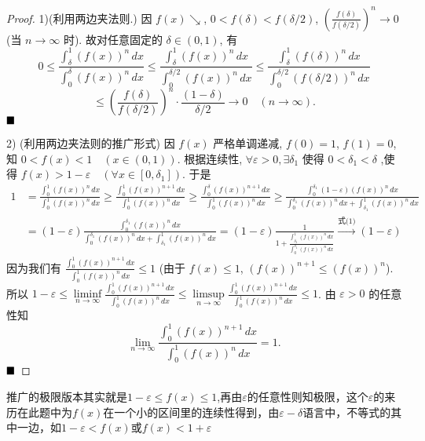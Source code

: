 \documentclass[lang=cn,newtx,10pt,scheme=chinese]{elegantbook}
\begin{document}
\begin{proof}
1)(利用两边夹法则.) 因 $f(x) \searrow$, $0 < f(\delta) < f(\delta/2)$, $\left(\frac{f(\delta)}{f(\delta/2)}\right)^n \to 0$ (当 $n \to \infty$ 时). 故对任意固定的 $\delta \in (0,1)$, 有
$$0 \leq \frac{\int_{\delta}^{1} (f(x))^n \,dx}{\int_{0}^{\delta} (f(x))^n \,dx} \leq \frac{\int_{\delta}^{1} (f(x))^n \,dx}{\int_{0}^{\delta/2} (f(x))^n \,dx} \leq \frac{\int_{\delta}^{1} (f(\delta))^n \,dx}{\int_{0}^{\delta/2} (f(\delta/2))^n \,dx}$$
$$\leq \left(\frac{f(\delta)}{f(\delta/2)}\right)^n \cdot \frac{(1-\delta)}{\delta/2} \to 0 \quad (n \to \infty).$$
$\hfill \blacksquare$

2)
(利用两边夹法则的推广形式) 因 $f(x)$ 严格单调递减, $f(0)=1$, $f(1)=0$, 知 $0 < f(x) < 1 \quad (x \in (0,1))$. 根据连续性, $\forall \varepsilon > 0, \exists \delta_1$ 使得 $0 < \delta_1 < \delta$ ,使得 $f(x) > 1-\varepsilon \quad (\forall x \in [0, \delta_1])$. 于是
\begin{align*} 1 &= \frac{\int_0^1 (f(x))^n \,dx}{\int_0^1 (f(x))^n \,dx}  \geq \frac{\int_0^1 (f(x))^{n+1} \,dx}{\int_0^1 (f(x))^n \,dx} \geq \frac{\int_0^{\delta} (f(x))^{n+1} \,dx}{\int_0^1 (f(x))^n \,dx} \geq \frac{\int_0^{\delta_1} (1-\varepsilon) (f(x))^n \,dx}{\int_0^{\delta_1} (f(x))^n \,dx + \int_{\delta_1}^1 (f(x))^n \,dx} \\ &= (1-\varepsilon) \frac{\int_0^{\delta_1} (f(x))^n \,dx}{\int_0^{\delta_1} (f(x))^n \,dx + \int_{\delta_1}^1 (f(x))^n \,dx} = (1-\varepsilon) \frac{1}{1 + \frac{\int_{\delta_1}^1 (f(x))^n \,dx}{\int_0^{\delta_1} (f(x))^n \,dx}} \xrightarrow{\text{式(1)}} (1-\varepsilon)  \end{align*}
因为我们有 $\frac{\int_0^1 (f(x))^{n+1} \,dx}{\int_0^1 (f(x))^n \,dx} \leq 1$ (由于 $f(x) \leq 1$, $(f(x))^{n+1} \leq (f(x))^n$).
所以 $1-\varepsilon \leq \liminf\limits_{n \to \infty} \frac{\int_0^1 (f(x))^{n+1} \,dx}{\int_0^1 (f(x))^n \,dx} \leq \limsup\limits_{n \to \infty} \frac{\int_0^1 (f(x))^{n+1} \,dx}{\int_0^1 (f(x))^n \,dx} \leq 1$.
由 $\varepsilon > 0$ 的任意性知
$$ \lim\limits_{n \to \infty} \frac{\int_0^1 (f(x))^{n+1} \,dx}{\int_0^1 (f(x))^n \,dx} = 1. $$
$\hfill \blacksquare$
\end{proof}
\begin{note}
    推广的极限版本其实就是$1- \varepsilon \le f(x) \le 1$,再由$\varepsilon$的任意性则知极限，这个$\varepsilon$的来历在此题中为$f(x)$在一个小的区间里的连续性得到，由$\varepsilon - \delta$语言中，不等式的其中一边，如$1-\varepsilon < f(x)$或$f(x)<1+\varepsilon$
\end{note}
\end{document}
